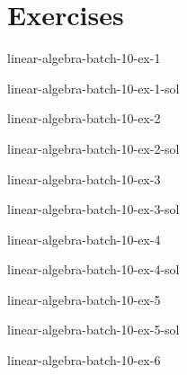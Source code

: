 \documentclass[preview]{standalone}
\begin{document}
\genpage

\section{Exercises}

\begin{snippetexercise}{linear-algebra-batch-10-ex-1}{}
    \todo
\end{snippetexercise}

\begin{snippetsolution}{linear-algebra-batch-10-ex-1-sol}{}
    \todo
\end{snippetsolution}

\begin{snippetexercise}{linear-algebra-batch-10-ex-2}{}
    \todo
\end{snippetexercise}

\begin{snippetsolution}{linear-algebra-batch-10-ex-2-sol}{}
    \todo
\end{snippetsolution}

\begin{snippetexercise}{linear-algebra-batch-10-ex-3}{}
    \todo
\end{snippetexercise}

\begin{snippetsolution}{linear-algebra-batch-10-ex-3-sol}{}
    \todo
\end{snippetsolution}

\begin{snippetexercise}{linear-algebra-batch-10-ex-4}{}
    \todo
\end{snippetexercise}

\begin{snippetsolution}{linear-algebra-batch-10-ex-4-sol}{}
    \todo
\end{snippetsolution}

\begin{snippetexercise}{linear-algebra-batch-10-ex-5}{}
    \todo
\end{snippetexercise}

\begin{snippetsolution}{linear-algebra-batch-10-ex-5-sol}{}
    \todo
\end{snippetsolution}

\begin{snippetexercise}{linear-algebra-batch-10-ex-6}{}
    \todo
\end{snippetexercise}
\end{document}
